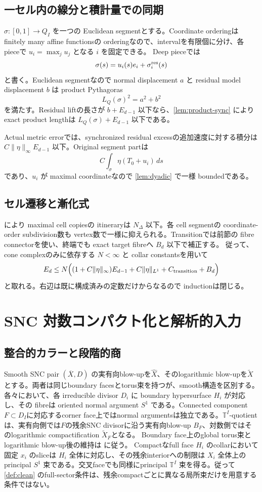 \documentclass[11pt,a4paper]{ltjsarticle}
\newcommand{\ov}{\overline}
\theoremstyle{plain}
\theoremstyle{definition}
\theoremstyle{remark}
\begin{document}
\subsection{一セル内の線分と積計量での同期}
$\sigma:[0,1]\to Q_I$ を一つの Euclidean segmentとする。Coordinate orderingは finitely many affine functionsの orderingなので、intervalを有限個に分け、各 pieceで $u_i=\max_j u_j$ となる $i$ を固定できる。
Deep pieceでは
\[
 \sigma(s)=u_i(s)e_i+\sigma_i^{\rm res}(s)
\]
と書く。Euclidean segmentなので normal displacement $a$ と residual model displacement $b$ は product Pythagoras
\[
 L_Q(\sigma)^2=a^2+b^2
\]
を満たす。Residual liftの長さが $b+E_{d-1}$ 以下なら、\cref{lem:product-sync} により exact product lengthは $L_Q(\sigma)+E_{d-1}$ 以下である。

Actual metric errorでは、synchronized residual excessの追加速度に対する積分は $C\|\eta\|_\infty E_{d-1}$ 以下。Original segment partは
\[
 C\int_\sigma\eta(T_0+u_i)\,ds
\]
であり、$u_i$ が maximal coordinateなので \cref{lem:dyadic} で一様 boundedである。

\subsection{セル遷移と漸化式}
 により maximal cell copiesの itineraryは $N_\Delta$ 以下。各 cell segmentの coordinate-order subdivision数も vertex数で一様に抑えられる。Transitionでは前節の fibre connectorを使い、終端でも exact target fibreへ $B_d$ 以下で補正する。
従って、cone complexのみに依存する $N<\infty$ と collar constantsを用いて
\[
 E_d\le
 N\Bigl(
 (1+C\|\eta\|_\infty)E_{d-1}
 +C\|\eta\|_{L^1}
 +C_{\rm transition}+B_d
 \Bigr)
\]
と取れる。右辺は既に構成済みの定数だけからなるので inductionは閉じる。

\section{SNC 対数コンパクト化と解析的入力}
\label{app:SNC}

\subsection{整合的カラーと段階的商}
Smooth SNC pair $(\ov X,D)$ の実有向blow-upを$\widehat X$、そのlogarithmic blow-upを$\widetilde X$とする。両者は同じboundary facesとtorus束を持つが、smooth構造を区別する。各々において、各 irreducible divisor $D_i$ に boundary hypersurface $H_i$ が対応し、その fibreは oriented normal argument $S^1$ である。Connected component $F\subset D_I$に対応するcorner face上ではnormal argumentsは独立である。$\mathbb T^I$-quotientは、実有向側では$F$の残余SNC divisorに沿う実有向blow-up $B_F$、対数側ではそのlogarithmic compactification $\widetilde X_F$となる。
Boundary face上のglobal torus束とlogarithmic blow-up後の維持は
\cite[Lemma~1.1, \S1, (1.10)--(1.15)]{RochonZhang} に従う。
Compactなfull face $H_i$ のcollarにおいて固定 $x_i$ のsliceは $H_i$ 全体に対応し、その残余interiorへの制限は $X_i$ 全体上のprincipal $S^1$ 束である。交叉faceでも同様にprincipal $\mathbb T^I$ 束を得る。従って \cref{def:clean} のfull-sector条件は、残余compactごとに異なる局所束だけを用意する条件ではない。
\end{document}

